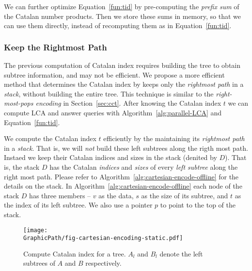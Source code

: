 % 



We can further optimize Equation~\ref{fun:tid} by pre-computing the
{\em prefix sum} of the Catalan number products.  Then we store these
sums in memory, so that we can use them directly, instead of
recomputing them as in Equation~\ref{fun:tid}.  


\subsubsection{Keep the Rightmost Path}

The previous computation of Catalan index requires building the tree
to obtain subtree information, and may not be efficient.  We propose a
more efficient method that determines the Catalan index by keeps only
the {\em rightmost path} in a {\em stack}, without building the entire
tree.  This technique is similar to the {\em right-most-pops encoding}
in Section~\ref{sec:cct}.  After knowing the Catalan index $t$ we can
compute LCA and answer queries with Algorithm~\ref{alg:parallel-LCA}
and Equation~\ref{fun:tid}.

We compute the Catalan index $t$ efficiently by the maintaining its
{\em rightmost path} in a {\em stack}.  That is, we will {\em not}
build these left subtrees along the rigth most path.  Instaed we keep
their Catalan indices and sizes in the stack (denited by $D$).  That
is, the stack $D$ has the Catalan {\em indices} and {\em sizes} of
every {\em left subtree} along the right most path.  Please refer to
Algorithm~\ref{alg:cartesian-encode-offline} for the details on the
stack.  In Algorithm~\ref{alg:cartesian-encode-offline} each node of
the stack $D$ has three members -- $v$ as the data, $s$ as the size of
its subtree, and $t$ as the index of its left subtree.  We also use a
pointer $p$ to point to the top of the stack.



\begin{figure}[!thb]
  \centering
  \texttt{[image: \\GraphicPath/fig-cartesian-encoding-static.pdf]}
  \caption{Compute Catalan index for a tree.  $A_l$ and $B_l$ denote
    the left subtrees of $A$ and $B$ respectively.}
  \label{fig:fig-cartesian-encoding-static}
\end{figure}

